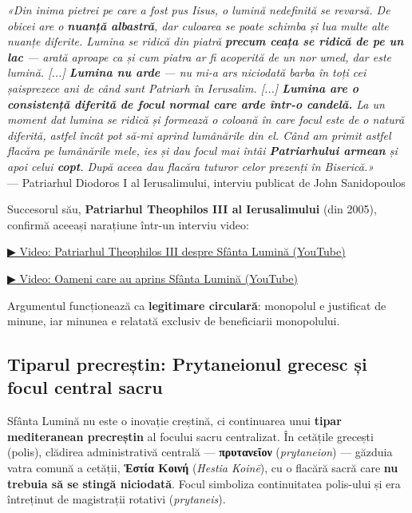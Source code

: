 \documentclass[12pt,a4paper,twoside,openany]{book}
\begin{document}
\begin{enochquote}
\textit{«Din inima pietrei pe care a fost pus Iisus, o lumină nedefinită se revarsă. De obicei are o \textbf{nuanță albastră}, dar culoarea se poate schimba și lua multe alte nuanțe diferite. Lumina se ridică din piatră \textbf{precum ceața se ridică de pe un lac} — arată aproape ca și cum piatra ar fi acoperită de un nor umed, dar este lumină. [...] \textbf{Lumina nu arde} — nu mi-a ars niciodată barba în toți cei șaisprezece ani de când sunt Patriarh în Ierusalim. [...] \textbf{Lumina are o consistență diferită de focul normal care arde într-o candelă.} La un moment dat lumina se ridică și formează o coloană în care focul este de o natură diferită, astfel încât pot să-mi aprind lumânările din el. Când am primit astfel flacăra pe lumânările mele, ies și dau focul mai întâi \textbf{Patriarhului armean} și apoi celui \textbf{copt}. După aceea dau flacăra tuturor celor prezenți în Biserică.»}
 \\
{\small\color{gray}— Patriarhul Diodoros I al Ierusalimului, interviu publicat de John Sanidopoulos}
\end{enochquote}
Succesorul său, \textbf{Patriarhul Theophilos III al Ierusalimului} (din 2005), confirmă aceeași narațiune într-un interviu video:

\href{https://www.youtube.com/watch?v=fXG53PPbFdw}{▶ Video: Patriarhul Theophilos III despre Sfânta Lumină (YouTube)}

\href{https://www.youtube.com/watch?v=V-Uuuim0MbM}{▶ Video: Oameni care au aprins Sfânta Lumină (YouTube)}

Argumentul funcționează ca \textbf{legitimare circulară}: monopolul e justificat de minune, iar minunea e relatată exclusiv de beneficiarii monopolului.

\subsection{Tiparul precreștin: Prytaneionul grecesc și focul central sacru}

Sfânta Lumină nu este o inovație creștină, ci continuarea unui \textbf{tipar mediteranean precreștin} al focului sacru centralizat. În cetățile grecești (polis), clădirea administrativă centrală --- \textbf{πρυτανεῖον} (\textit{prytaneion}) --- găzduia vatra comună a cetății, \textbf{Ἑστία Κοινή} (\textit{Hestia Koinē}), cu o flacără sacră care \textbf{nu trebuia să se stingă niciodată}. Focul simboliza continuitatea polis-ului și era întreținut de magistrații rotativi (\textit{prytaneis}).
\end{document}
